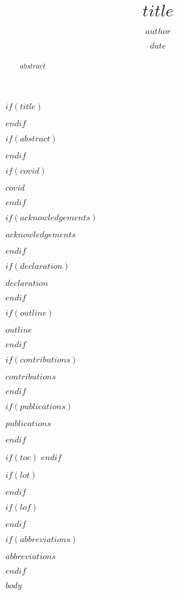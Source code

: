 \documentclass[11pt,twoside]{bristolthesis}
\title{$title$}
\author{$author$}
\date{$date$}
\newcommand\blankpage{%
    \null
    \thispagestyle{empty}%
    \addtocounter{page}{-1}%
    \newpage}
\begin{document}
$if(title)$
  \maketitle
$endif$

\frontmatter %
\pagestyle{empty} %
\begingroup

$if(abstract)$
  \begin{abstract}
    $abstract$
  \end{abstract}
$endif$

$if(covid)$
  \begin{covid}
    $covid$
  \end{covid}
$endif$

$if(acknowledgements)$
  \begin{acknowledgements}
    $acknowledgements$
  \end{acknowledgements}
$endif$

$if(declaration)$
  \begin{declaration}
    $declaration$
  \end{declaration}
$endif$

$if(outline)$
  \begin{outline}
    $outline$
  \end{outline}
$endif$

$if(contributions)$
  \begin{contributions}
    $contributions$
  \end{contributions}
$endif$

$if(publications)$
  \begin{publications}
    $publications$
    \afterpage{\blankpage}
  \end{publications}
$endif$

$if(toc)$
  \hypersetup{linkcolor=$if(toccolor)$$toccolor$$else$black$endif$}
  {
  \setcounter{tocdepth}{$toc-depth$}
  \setcounter{secnumdepth}{$toc-depth$}
  \tableofcontents
  }
$endif$

$if(lot)$
  \listoftables
$endif$

$if(lof)$
  \listoffigures
$endif$

$if(abbreviations)$
  \begin{abbreviations}
    $abbreviations$
    \afterpage{\blankpage}
  \end{abbreviations}
$endif$

\endgroup


\mainmatter %
\pagestyle{plain}

$body$
\end{document}
